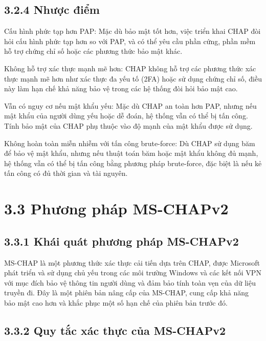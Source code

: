  \subsection*{3.2.4 Nhược điểm}

Cấu hình phức tạp hơn PAP: Mặc dù bảo mật tốt hơn, việc triển khai CHAP đòi hỏi cấu hình phức tạp hơn so với PAP, và có thể yêu cầu phần cứng, phần mềm hỗ trợ chứng chỉ số hoặc các phương thức bảo mật khác.

Không hỗ trợ xác thực mạnh mẽ hơn: CHAP không hỗ trợ các phương thức xác thực mạnh mẽ hơn như xác thực đa yếu tố (2FA) hoặc sử dụng chứng chỉ số, điều này làm hạn chế khả năng bảo vệ trong các hệ thống đòi hỏi bảo mật cao.

Vẫn có nguy cơ nếu mật khẩu yếu: Mặc dù CHAP an toàn hơn PAP, nhưng nếu mật khẩu của người dùng yếu hoặc dễ đoán, hệ thống vẫn có thể bị tấn công. Tính bảo mật của CHAP phụ thuộc vào độ mạnh của mật khẩu được sử dụng.

Không hoàn toàn miễn nhiễm với tấn công brute-force: Dù CHAP sử dụng băm để bảo vệ mật khẩu, nhưng nếu thuật toán băm hoặc mật khẩu không đủ mạnh, hệ thống vẫn có thể bị tấn công bằng phương pháp brute-force, đặc biệt là nếu kẻ tấn công có đủ thời gian và tài nguyên.


 \section*{3.3 Phương pháp MS-CHAPv2}
 \subsection*{3.3.1 Khái quát phương pháp MS-CHAPv2}

 MS-CHAP là một phương thức xác thực cải tiến dựa trên CHAP, được Microsoft phát triển và sử dụng chủ yếu trong các môi trường Windows và các kết nối VPN với mục đích bảo vệ thông tin người dùng và đảm bảo tính toàn vẹn của dữ liệu truyền đi. Đây là một phiên bản nâng cấp của MS-CHAP, cung cấp khả năng bảo mật cao hơn và khắc phục một số hạn chế của phiên bản trước đó.

\subsection*{3.3.2 Quy tắc xác thực của MS-CHAPv2}

